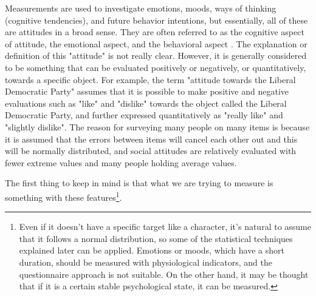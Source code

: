 \documentclass{ltjsbook}
\begin{document}
Measurements are used to investigate emotions, moods, ways of thinking (cognitive tendencies), and future behavior intentions, but essentially, all of these are attitudes in a broad sense. They are often referred to as the cognitive aspect of attitude, the emotional aspect, and the behavioral aspect \parencite{Fujihara2001}.
The explanation or definition of this "attitude" is not really clear. However, it is generally considered to be something that can be evaluated positively or negatively, or quantitatively, towards a specific object. For example, the term "attitude towards the Liberal Democratic Party" assumes that it is possible to make positive and negative evaluations such as "like" and "dislike" towards the object called the Liberal Democratic Party, and further expressed quantitatively as "really like" and "slightly dislike". The reason for surveying many people on many items is because it is assumed that the errors between items will cancel each other out and this will be normally distributed, and social attitudes are relatively evaluated with fewer extreme values and many people holding average values.

The first thing to keep in mind is that what we are trying to measure is something with these features\footnote{Even if it doesn't have a specific target like a character, it's natural to assume that it follows a normal distribution, so some of the statistical techniques explained later can be applied. Emotions or moods, which have a short duration, should be measured with physiological indicators, and the questionnaire approach is not suitable. On the other hand, it may be thought that if it is a certain stable psychological state, it can be measured.}.
\end{document}
